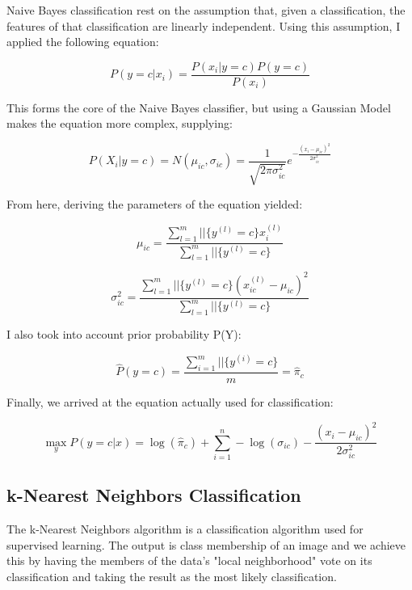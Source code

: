\documentclass[10pt,twocolumn,letterpaper]{article}
\begin{document}
Naive Bayes classification rest on the assumption that, given a classification, the features of that classification are linearly independent. Using this assumption, I applied the following equation:

\begin{equation}
    P(y=c|x_i)=\frac{P(x_i|y=c)P(y=c)}{P(x_i)}
\end{equation}

This forms the core of the Naive Bayes classifier, but using a Gaussian Model makes the equation more complex, supplying:

\begin{equation}
    P(X_i|y=c)=N(\mu_{ic},\sigma_{ic})=\frac{1}{\sqrt{2\pi\sigma_{ic}^2}}e^{-\frac{(x_i-\mu_{ic})^2}{2\sigma_{ic}^2}}
\end{equation}

From here, deriving the parameters of the equation yielded:

\begin{equation}
    \mu_{ic}=\frac{{\sum_{l=1}^m||\{y^{(l)}=c}\}x_i^{(l)}}{\sum_{l=1}^m||\{y^{(l)}=c\}}
\end{equation}

\begin{equation}
    \sigma_{ic}^2=\frac{\sum_{l=1}^m||\{y^{(l)}=c\}(x_{ic}^{(l)}-\mu_{ic})^2}{\sum_{l=1}^m||\{y^{(l)}=c\}}
\end{equation}

I also took into account prior probability P(Y):

\begin{equation}
    \hat{P}(y=c)=\frac{\sum_{i=1}^m||\{y^{(i)}=c\}}{m}=\hat{\pi}_c
\end{equation}

Finally, we arrived at the equation actually used for classification:

\begin{equation}
    \max_yP(y=c|x)=\log(\hat{\pi}_c)+\sum_{i=1}^n-\log(\sigma_{ic})-\frac{(x_i-\mu_{ic})^2}{2\sigma_{ic}^2}
\end{equation}

\subsection{k-Nearest Neighbors Classification}

The k-Nearest Neighbors algorithm is a classification algorithm used for supervised learning. The output is class membership of an image and we achieve this by having the members of the data's "local neighborhood" vote on its classification and taking the result as the most likely classification.
\end{document}
